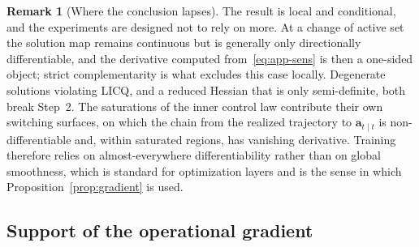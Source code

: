 \documentclass[11pt]{article}
\theoremstyle{plain}
\theoremstyle{definition}
\newtheorem{remark}{Remark}
\begin{document}
\begin{remark}[Where the conclusion lapses]
	\label{rem:gradient-scope}
	The result is local and conditional, and the experiments are
	designed not to rely on more. At a change of active set the
	solution map remains continuous but is generally only directionally
	differentiable, and the derivative computed
	from~\eqref{eq:app-sens} is then a one-sided object; strict
	complementarity is what excludes this case locally. Degenerate
	solutions violating LICQ, and a reduced Hessian that is only
	semi-definite, both break Step~2. The saturations of the inner
	control law contribute their own switching surfaces, on which the
	chain from the realized trajectory to $\bm{a}_{t\mid t}$ is
	non-differentiable and, within saturated regions, has vanishing
	derivative. Training therefore relies on almost-everywhere
	differentiability rather than on global smoothness, which is
	standard for optimization layers and is the sense in which
	Proposition~\ref{prop:gradient} is used.
\end{remark}

\subsection{Support of the operational gradient}
\label{app:support}
\end{document}
